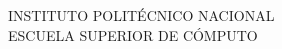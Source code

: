 
\begin{minipage}[b]{.2\textwidth}
\end{minipage}
\begin{minipage}{.6\textwidth}

  \begin{center}

        \large{INSTITUTO} \large{POLITÉCNICO} \large{NACIONAL}\\
        \large{ESCUELA} \large{SUPERIOR} \large{DE} \large{CÓMPUTO}\\

  \end{center}



\end{minipage}
\begin{minipage}[b]{.2\textwidth}
\end{minipage}

